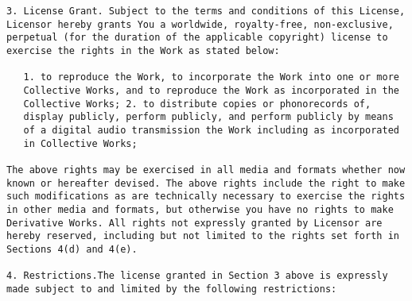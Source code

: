 \begin{lstlisting}
3. License Grant. Subject to the terms and conditions of this License,
Licensor hereby grants You a worldwide, royalty-free, non-exclusive,
perpetual (for the duration of the applicable copyright) license to
exercise the rights in the Work as stated below:

   1. to reproduce the Work, to incorporate the Work into one or more
   Collective Works, and to reproduce the Work as incorporated in the
   Collective Works; 2. to distribute copies or phonorecords of,
   display publicly, perform publicly, and perform publicly by means
   of a digital audio transmission the Work including as incorporated
   in Collective Works;

The above rights may be exercised in all media and formats whether now
known or hereafter devised. The above rights include the right to make
such modifications as are technically necessary to exercise the rights
in other media and formats, but otherwise you have no rights to make
Derivative Works. All rights not expressly granted by Licensor are
hereby reserved, including but not limited to the rights set forth in
Sections 4(d) and 4(e).

4. Restrictions.The license granted in Section 3 above is expressly
made subject to and limited by the following restrictions:


\end{lstlisting}
